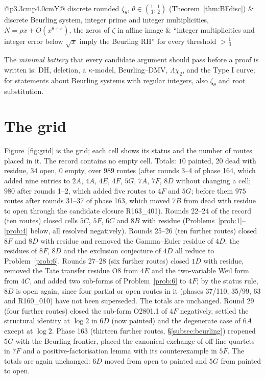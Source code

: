 \documentclass[11pt]{amsart}
\theoremstyle{definition}
\theoremstyle{remark}
\begin{document}
\begin{table}[ht]
\begin{tabularx}{\textwidth}{@{}p{3.3cm}p{4.0cm}Y@{}}
discrete rounded $\zeta_\theta$, $\theta\in(\frac13,\frac12)$ (Theorem~\ref{thm:BFdisc}) & discrete Beurling system, integer prime and integer multiplicities, $N=\rho x+O(x^{\theta+\varepsilon})$, the zeros of $\zeta$ in affine image & ``integer multiplicities and integer error below $\sqrt x$ imply the Beurling RH'' for every threshold $>\frac13$ \\
\bottomrule
\end{tabularx}
\end{table}

The \emph{minimal battery} that every candidate argument should pass before a proof is written is: DH,
deletion, a $\kappa$-model, Beurling--DMV, $\Lambda\chi_2$, and the Type I curve; for statements about Beurling systems with regular integers, also $\zeta_\theta$ and root substitution.

\section{The grid}\label{sec:grid}

Figure~\ref{fig:grid} is the grid; each cell shows its status and the number of routes placed in it.
The record contains no empty cell. Totals: $10$ painted, $20$ dead with residue, $34$ open, $0$ empty, over $989$ routes (after rounds 3--4 of phase 164, which added nine entries to $2A$, $4A$, $4E$, $4F$, $5G$, $7A$, $7F$, $8D$ without changing a cell; $980$ after rounds 1--2, which added five routes to $4F$ and $5G$; before them $975$ routes after rounds 31--37 of phase 163, which moved $7B$ from dead with residue to open through the candidate closure R163\_401). Rounds 22--24 of the record (ten routes) closed cells $5C$, $5F$, $6C$ and $8B$ with residue (Problems~\ref{prob:1}--\ref{prob:4} below, all resolved negatively). Rounds 25--26 (ten further routes) closed $8F$ and $8D$ with residue and removed the Gamma--Euler residue of $4D$; the residues of $8F$, $8D$ and the exclusion conjecture of $4D$ all reduce to Problem~\ref{prob:6}. Rounds 27--28 (six further routes) closed $1D$ with residue, removed the Tate transfer residue O8 from $4E$ and the two-variable Weil form from $4C$, and added two sub-forms of Problem~\ref{prob:6} to $4F$; by the status rule, $8D$ is open again, since four partial or open routes in it (phases 37/110, 35/99, 63 and R160\_010) have not been superseded. The totals are unchanged. Round 29 (four further routes) closed the sub-form O2801.1 of $4F$ negatively, settled the structural identity at $\log2$ in $6D$ (now painted) and the degenerate case of $6A$ except at $\log2$. Phase 163 (thirteen further routes, \S\ref{subsec:beurling}) reopened $5G$ with the Beurling frontier, placed the canonical exchange of off-line quartets in $7F$ and a positive-factorisation lemma with its counterexample in $5F$. The totals are again unchanged: $6D$ moved from open to painted and $5G$ from painted to open.
\end{document}

